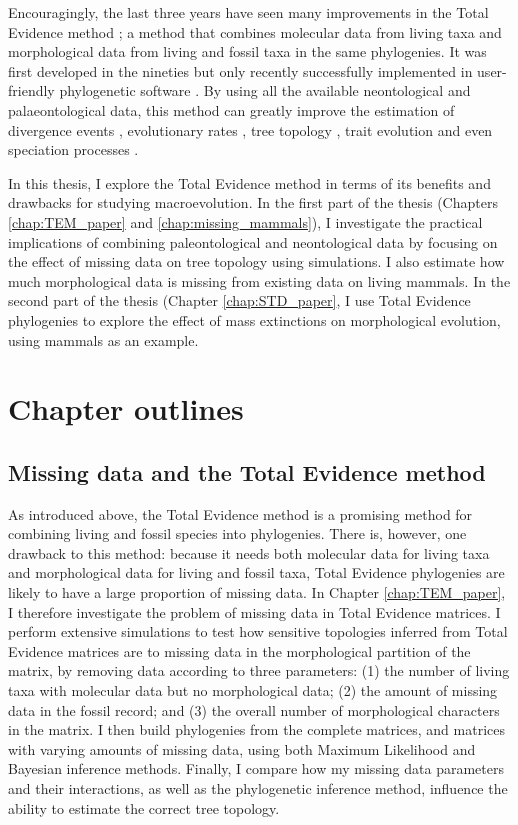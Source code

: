 Encouragingly, the last three years have seen many improvements in the Total Evidence method \citep{ronquista2012,Slater2012MEE,Wood01032013,schragocombining2013,beckancient2014,Arcila2015131,Dembo2015}; a method that combines molecular data from living taxa and morphological data from living and fossil taxa in the same phylogenies.
It was first developed in the nineties \citep{eernissetaxonomic1993} but only recently successfully implemented in user-friendly phylogenetic software \citep{Ronquist2012mrbayes,BEAST2}.
By using all the available neontological and palaeontological data, this method can greatly improve the estimation of divergence events \citep[e.g.][]{ronquista2012}, evolutionary rates \citep[e.g.][]{beckancient2014}, tree topology \citep[e.g.][]{Dembo2015}, trait evolution \citep[e.g.][]{Slater2012MEE} and even speciation processes \citep[e.g.][]{Wood01032013}.

In this thesis, I explore the Total Evidence method in terms of its benefits and drawbacks for studying macroevolution.
In the first part of the thesis (Chapters \ref{chap:TEM_paper} and \ref{chap:missing_mammals}), I investigate the practical implications of combining paleontological and neontological data by focusing on the effect of missing data on tree topology using simulations. I also estimate how much morphological data is missing from existing data on living mammals.
In the second part of the thesis (Chapter \ref{chap:STD_paper}, I use Total Evidence phylogenies to explore the effect of mass extinctions on morphological evolution, using mammals as an example.

\section{Chapter outlines}
\subsection{Missing data and the Total Evidence method}
As introduced above, the Total Evidence method is a promising method for combining living and fossil species into phylogenies.
There is, however, one drawback to this method: because it needs both molecular data for living taxa and morphological data for living and fossil taxa, Total Evidence phylogenies are likely to have a large proportion of missing data.
In Chapter \ref{chap:TEM_paper}, I therefore investigate the problem of missing data in Total Evidence matrices.
I perform extensive simulations to test how sensitive topologies inferred from Total Evidence matrices are to missing data in the morphological partition of the matrix, by removing data according to three parameters: (1) the number of living taxa with molecular data but no morphological data; (2) the amount of missing data in the fossil record; and (3) the overall number of morphological characters in the matrix.
I then build phylogenies from the complete matrices, and matrices with varying amounts of missing data, using both Maximum Likelihood and Bayesian inference methods.
Finally, I compare how my missing data parameters and their interactions, as well as the phylogenetic inference method, influence the ability to estimate the correct tree topology.

